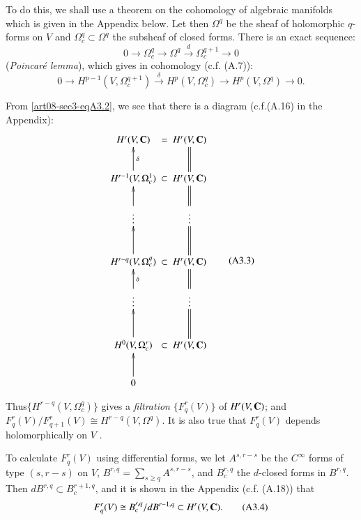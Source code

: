 To do this, we shall use a theorem on the cohomology of algebraic manifolds which is given in the Appendix below. Let then $\Omega^{q}$ be the sheaf of holomorphic $q$-forms on $V$ and $\Omega^{q}_{c}\subset \Omega^{q}$ the subsheaf of closed forms. There is an exact sequence:
\begin{equation*}
0\to \Omega^{q}_{c}\to \Omega^{q}\xrightarrow{d}\Omega^{q+1}_{c}\to 0\tag{A3.1}\label{art08-sec3-eqA3.1}
\end{equation*}
({\em Poincar\'e lemma}), which gives in cohomology (c.f. (A.7)):
\begin{equation*}
0\to H^{p-1}(V,\Omega^{q+1}_{c})\xrightarrow{\delta}H^{p}(V,\Omega^{q}_{c})\to H^{p}(V,\Omega^{q})\to 0.\tag{A3.2}\label{art08-sec3-eqA3.2}
\end{equation*}

From \eqref{art08-sec3-eqA3.2}, we see that there is a diagram (c.f.(A.16) in the Appendix):
\begin{equation*}
\vcenter{
\xymatrix@C=-.02cm{
H^{r}(V,\bfC) & = & H^{r}(V,\bfC)\\
H^{r-1}(V,\Omega^{1}_{c})\ar[u]_-{\delta} & \subset & H^{r}(V,\bfC)\ar@{=}[u]\\
\vdots\ar[u] & & \vdots\ar@{=}[u]\\
H^{r-q}(V,\Omega^{q}_{c})\ar[u] & \subset & H^{r}(V,\bfC)\ar@{=}[u]\\
\vdots\ar[u]_-{\delta} & & \vdots\ar@{=}[u]\\
H^{0}(V,\Omega^{r}_{c})\ar[u] & \subset & H^{r}(V,\bfC)\ar@{=}[u]\\
0\ar[u] & &
}}\tag{A3.3}\label{art08-sec3-eqA3.3}
\end{equation*}

Thus\pageoriginale $\{H^{r-q}(V,\Omega^{q}_{c})\}$ gives a {\em filtration} $\{F^{r}_{q}(V)\}$ of $H^{r}(V,\mathbf{C})$; and\break $F^{r}_{q}(V)/F^{r}_{q+1}(V)\cong H^{r-q}(V,\Omega^{q})$. It is also true that $F^{r}_{q}(V)$ depends holomorphically on $V$ \cite{art08-key9}.

To calculate $F^{r}_{q}(V)$ using differential forms, we let $A^{s,r-s}$ be the $C^{\infty}$ forms of type $(s,r-s)$ on $V$, $B^{r,q}=\sum\limits_{s\geq q}A^{s,r-s}$, and $B^{r,q}_{c}$ the $d$-closed forms in $B^{r,q}$. Then $dB^{r,q}\subset B^{r+1,q}_{c}$, and it is shown in the Appendix (c.f. (A.18)) that
\begin{equation*}
F^{r}_{q}(V)\cong B^{r,q}_{c}/dB^{r-1,q}\subset H^{r}(V,\mathbf{C}).\tag{A3.4}\label{art08-sec3-eqA3.4}
\end{equation*}

